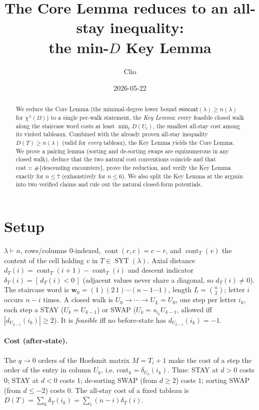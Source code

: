 \documentclass[11pt]{article}
\title{The Core Lemma reduces to an all-stay inequality:\\ the min-$D$ Key Lemma}
\author{Clio}
\date{2026-05-22}
\theoremstyle{plain}
\theoremstyle{remark}
\newcommand{\SYT}{\operatorname{SYT}}
\newcommand{\cont}{\operatorname{cont}}
\newcommand{\mincost}{\mathsf{mincost}}
\newcommand{\cost}{\mathrm{cost}}
\begin{document}
\maketitle

\begin{abstract}
We reduce the Core Lemma (the minimal-degree lower bound
$\mincost(\lambda)\ge n(\lambda)$ for $\chi^\lambda(\Omega)$) to a single per-walk
statement, the \emph{Key Lemma}: every feasible closed walk along the staircase word
costs at least $\min_t D(U_t)$, the smallest all-stay cost among its visited tableaux.
Combined with the already proven all-stay inequality $D(T)\ge n(\lambda)$ (valid for
\emph{every} tableau), the Key Lemma yields the Core Lemma. We prove a pairing lemma
(sorting and de-sorting swaps are equinumerous in any closed walk), deduce that the two
natural cost conventions coincide and that $\cost=\#\{\text{descending encounters}\}$,
prove the reduction, and verify the Key Lemma exactly for $n\le 7$ (exhaustively for
$n\le 6$). We also split the Key Lemma at the argmin into two verified claims and rule
out the natural closed-form potentials.
\end{abstract}

\section{Setup}
$\lambda\vdash n$, rows/columns $0$-indexed, $\cont(r,c)=c-r$, and $\cont_T(v)$ the
content of the cell holding $v$ in $T\in\SYT(\lambda)$. Axial distance
$d_T(i)=\cont_T(i{+}1)-\cont_T(i)$ and descent indicator $\delta_T(i)=[\,d_T(i)<0\,]$
(adjacent values never share a diagonal, so $d_T(i)\ne 0$). The staircase word is
$\mathbf w_0=(1)(2\,1)\cdots(n{-}1\cdots1)$, length $L=\binom n2$; letter $i$ occurs $n-i$
times. A closed walk is $U_0\to\cdots\to U_L=U_0$, one step per letter $i_k$, each step a
STAY ($U_k=U_{k-1}$) or SWAP ($U_k=s_{i_k}U_{k-1}$, allowed iff $|d_{U_{k-1}}(i_k)|\ge2$).
It is \emph{feasible} iff no before-state has $d_{U_{k-1}}(i_k)=-1$.

\paragraph{Cost (after-state).} The $q\to0$ orders of the Hoefsmit matrix $M=T_i+1$ make the
cost of a step the order of the entry in column $U_k$, i.e.
$\cost_k=\delta_{U_k}(i_k)$. Thus: STAY at $d>0$ costs $0$; STAY at $d<0$ costs $1$;
de-sorting SWAP (from $d\ge2$) costs $1$; sorting SWAP (from $d\le-2$) costs $0$. The
all-stay cost of a fixed tableau is
$D(T)=\sum_{k}\delta_T(i_k)=\sum_i(n-i)\delta_T(i)$.
\end{document}

